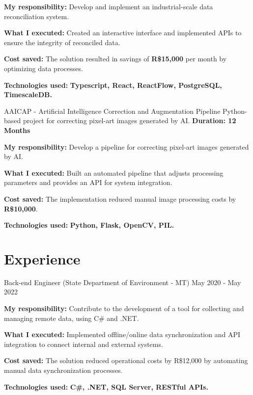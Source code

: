 \resumeItemListStart
\item \textbf{My responsibility:} Develop and implement an industrial-scale data reconciliation system.
\item \textbf{What I executed:} Created an interactive interface and implemented APIs to ensure the integrity of reconciled data.
\item \textbf{Cost saved:} The solution resulted in savings of \textbf{R\$15,000} per month by optimizing data processes.
\item \textbf{Technologies used:} \textbf{Typescript, React, ReactFlow, PostgreSQL, TimescaleDB.}
\resumeItemListEnd

\vspace{-2mm}

\resumeProject
{ AAICAP - \textmd{Artificial Intelligence Correction and Augmentation Pipeline}}
{Python-based project for correcting pixel-art images generated by AI.}
{\textbf{Duration: 12 Months}}

\resumeItemListStart
\item \textbf{My responsibility:} Develop a pipeline for correcting pixel-art images generated by AI.
\item \textbf{What I executed:} Built an automated pipeline that adjusts processing parameters and provides an API for system integration.
\item \textbf{Cost saved:} The implementation reduced manual image processing costs by \textbf{R\$10,000}.
\item \textbf{Technologies used:} \textbf{Python, Flask, OpenCV, PIL.}
\resumeItemListEnd

\resumeSubHeadingListEnd
\vspace{-8.5mm}

\section{\textbf{Experience}}
\resumeSubHeadingListStart
\resumeSubheading
{ Back-end Engineer \textmd{(State Department of Environment - MT)}}{}
{}{May 2020 - May 2022}
\vspace{-2.0mm}
\resumeItemListStart
\item \textbf{My responsibility:} Contribute to the development of a tool for collecting and managing remote data, using C\# and .NET.
\item \textbf{What I executed:} Implemented offline/online data synchronization and API integration to connect internal and external systems.
\item \textbf{Cost saved:} The solution reduced operational costs by R\$12,000 by automating manual data synchronization processes.
\item \textbf{Technologies used:} \textbf{C\#, .NET, SQL Server, RESTful APIs.}
\resumeItemListEnd

